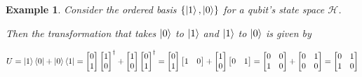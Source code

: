 \documentclass[12pt,twoside,fleqn]{report}
\theoremstyle{thmstyle}
\newtheorem{eg}{Example}[chapter]
\begin{document}
\begin{eg}
    Consider the ordered basis $\{ \ket{1}, \ket{0} \}$ for a qubit's state space $\mathcal{H}$.

    Then the transformation that takes $\ket{0}$ to $\ket{1}$ and $\ket{1}$ to $\ket{0}$ is given by 

    $U = \ket{1}\bra{0} + \ket{0} \bra{1} = \begin{bmatrix} 0 \\ 1 \end{bmatrix} \begin{bmatrix} 1 \\ 0 \end{bmatrix}^\dagger + \begin{bmatrix} 1 \\ 0  \end{bmatrix} \begin{bmatrix} 0 \\ 1 \end{bmatrix}^\dagger = \begin{bmatrix} 0 \\ 1 \end{bmatrix} \begin{bmatrix} 1 & 0 \end{bmatrix} + \begin{bmatrix} 1 \\ 0 \end{bmatrix} \begin{bmatrix} 0 & 1 \end{bmatrix} = \begin{bmatrix} 0 & 0 \\ 1 & 0 \end{bmatrix} + \begin{bmatrix} 0 & 1 \\ 0 & 0 \end{bmatrix} = \begin{bmatrix} 0 & 1 \\ 1 & 0 \end{bmatrix}$
\end{eg}
\end{document}
